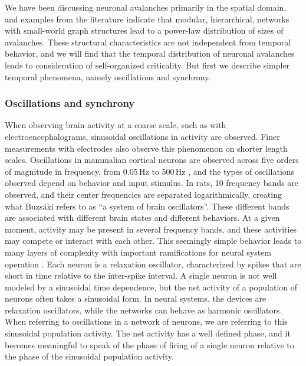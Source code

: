 \documentclass[twocolumn]{article}
\begin{document}
We have been discussing neuronal avalanches primarily in the spatial domain, and examples from the literature indicate that modular, hierarchical, networks with small-world graph structures lead to a power-law distribution of sizes of avalanches. These structural characteristics are not independent from temporal behavior, and we will find that the temporal distribution of neuronal avalanches leads to consideration of self-organized criticality. But first we describe simpler temporal phenomena, namely oscillations and synchrony.

\subsubsection{Oscillations and synchrony}
When observing brain activity at a coarse scale, such as with electroencephalograms, sinusoidal oscillations in activity are observed. Finer measurements with electrodes also observe this phenomenon on shorter length scales. Oscillations in mammalian cortical neurons are observed across five orders of magnitude in frequency, from 0.05\,Hz to 500\,Hz \cite{budr2004}, and the types of oscillations observed depend on behavior and input stimulus. In rats, 10 frequency bands are observed, and their center frequencies are separated logarithmically, creating what Buzs\'{a}ki refers to as ``a system of brain oscillators''. These different bands are associated with different brain states and different behaviors. At a given moment, activity may be present in several frequency bands, and these activities may compete or interact with each other.   This seemingly simple behavior leads to many layers of complexity with important ramifications for neural system operation \cite{bu2006}. Each neuron is a relaxation oscillator, characterized by spikes that are short in time relative to the inter-spike interval. A single neuron is not well modeled by a sinusoidal time dependence, but the net activity of a population of neurons often takes a sinusoidal form. In neural systems, the devices are relaxation oscillators, while the networks can behave as harmonic oscillators. When referring to oscillations in a network of neurons, we are referring to this sinusoidal population activity. The net activity has a well defined phase, and it becomes meaningful to speak of the phase of firing of a single neuron relative to the phase of the sinusoidal population activity.
\end{document}
